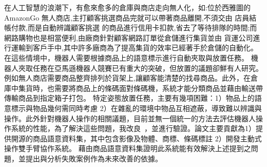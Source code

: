 \begin{abstractzh}
在人工智慧的浪潮下，有愈來愈多的倉庫與商店走向無人化，如:位於西雅圖的 AmazonGo 無人商店,主打顧客挑選商品完就可以帶著商品離開,不須交由
店員結帳付款,而是自動辨識顧客挑選 的商品進行信用卡扣款,省去了等待排隊的時間;而網路購物也是相當便利,由廠商針對顧客網路訂單從倉儲進行集貨並由
貨運公司進行運輸到客戶手中,其中許多廠商為了提高集貨的效率已經著手於倉儲的自動化。在這些情境中，機器人需要根據商品上的語意標示進行自動夾取與放置任務。
機器人夾取任務在亞馬遜機器人競賽已有重大的突破，但放置的議題卻鮮有人研究。例如無人商店需要商品整齊排列於貨架上,讓顧客能清楚的找尋商品。此外，在倉庫中集貨時，也需要將商品上的條碼面對條碼機，系統才能分類商品並藉由輸送帶傳輸商品到指定箱子打包。
特定姿態放置任務，主要有幾項困難：1）物品上的語意標示與物品幾何需同時考慮 2）在雜亂的環境中物品互相遮蔽，導致難以辨識與操作。此外針對機器人操作的相關議題，目前並無一個統一的方法去評估機器人操作系統的性能，為了解決這些問題，我改良~\cite{peterthesis}，並進行驗證。論文主要貢獻為1）提供開源的商品語意資料集，其中包含影像及物體、商標、條碼標註 2）開發主動式操作雙手臂協作系統。
藉由商品語意資料集證明此系統能有效解決上述提到之問題，並提出與分析失敗案例作為未來改善的依據。

\end{abstractzh}
